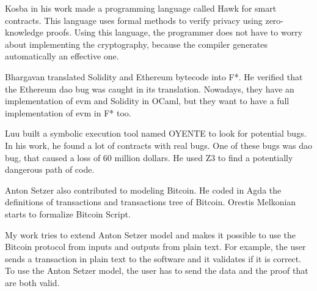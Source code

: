 Kosba \cite{kosba2016hawk} in his work made a programming language called Hawk for smart contracts.
This language uses formal methods to verify privacy using zero-knowledge proofs.
Using this language, the programmer does not have to worry about implementing the cryptography,
because the compiler generates automatically an effective one.

Bhargavan \cite{bhargavan2016formal} translated Solidity and Ethereum bytecode into F*.
He verified that the Ethereum \gls{dao} bug was caught in its translation.
Nowadays, they have an implementation of \gls{evm} and Solidity in OCaml,
but they want to have a full implementation of \gls{evm} in F* too.

Luu \cite{luu2016making} built a symbolic execution tool named OYENTE to look for potential bugs.
In his work, he found a lot of contracts with real bugs.
One of these bugs was \gls{dao} bug, that caused a loss of 60 million dollars.
He used Z3 to find a potentially dangerous path of code.

Anton Setzer \cite{setzer2018modelling} also contributed to modeling Bitcoin.
He coded in Agda the definitions of transactions and
transactions tree of Bitcoin.
Orestis Melkonian starts to formalize Bitcoin Script.

My work tries to extend Anton Setzer model and makes it possible to use the Bitcoin protocol
from inputs and outputs from plain text.
For example, the user sends a transaction in plain text to the software and it validates if it is correct.
To use the Anton Setzer model, the user has to send the data and the proof that are both valid.
